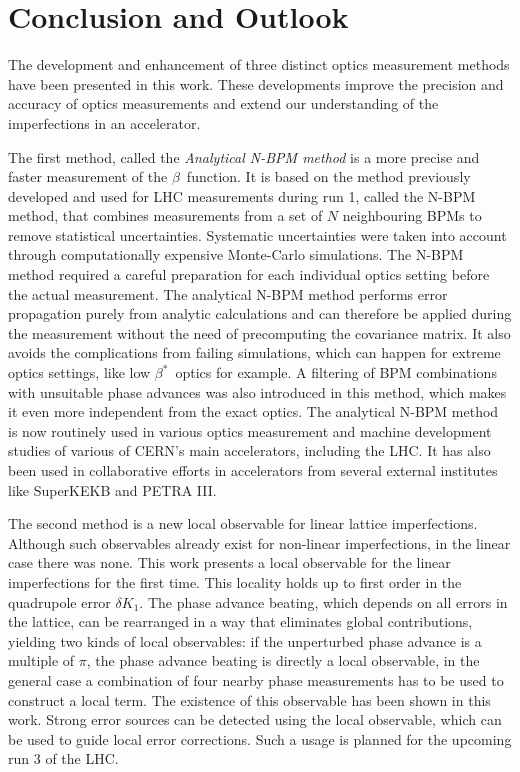 \chapter{Conclusion and Outlook}

The development and enhancement of three distinct optics measurement methods have been presented in this work.
These developments improve the precision and accuracy of optics measurements and extend our understanding of the
imperfections in an accelerator.

The first method, called the \emph{Analytical N-BPM method} is a more precise and faster measurement of the $\beta$~function.
It is based on the method previously developed and used for LHC measurements during run 1, called the N-BPM method,
that combines measurements from a set of $N$ neighbouring BPMs to remove statistical uncertainties.
Systematic uncertainties were taken into account through computationally expensive Monte-Carlo simulations.
The N-BPM method required a careful preparation for each individual optics setting before the actual measurement.
The analytical N-BPM method performs error propagation purely from analytic calculations and can therefore be applied
during the measurement without the need of precomputing the covariance matrix.
It also avoids the complications from failing simulations, which can happen for extreme optics settings,
like low $\beta^*$~optics for example.
A filtering of BPM combinations with unsuitable phase advances was also introduced in this method, which makes it even
more independent from the exact optics.
The analytical N-BPM method is now routinely used in various optics measurement and machine development
studies of various of CERN's main accelerators, including the LHC.
It has also been used in collaborative
efforts in accelerators from several external institutes like SuperKEKB and PETRA III.

The second method is a new local observable for linear lattice imperfections.
Although such observables already exist for non-linear imperfections, in the linear case there was none.
This work presents a local observable for the linear imperfections for the first time. This locality holds up to first
order in the quadrupole error $\delta K_1$.
The phase advance beating, which depends on all errors in the lattice, can be rearranged in a way that eliminates
global contributions, yielding two kinds of local observables:
if the unperturbed phase advance is a multiple of $\pi$, the phase advance beating is directly a local observable,
in the general case a combination of four nearby phase measurements has to be used to construct a local term.
The existence of this observable has been shown in this work.
Strong error sources can be detected using the local observable, which can be used to guide local error corrections.
Such a usage is planned for the upcoming run 3 of the LHC.


